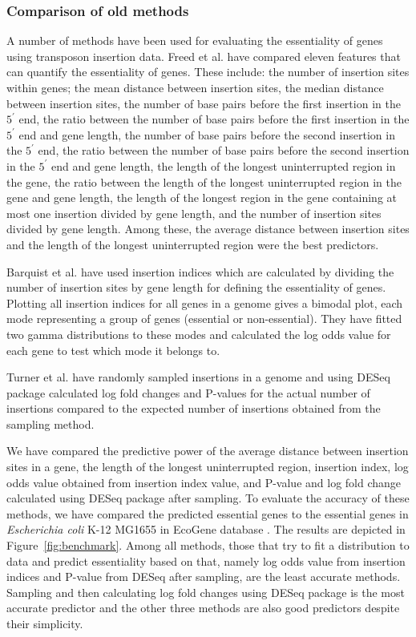 \documentclass[12pt,letterpaper]{article}
\begin{document}
\subsubsection{Comparison of old methods}
A number of methods have been used for evaluating the essentiality of genes using transposon insertion data. Freed et al. \cite{freed_combining_2016} have compared eleven features that can quantify the essentiality of genes. These include: the number of insertion sites within genes; the mean distance between insertion sites, the median distance between insertion sites, the number of base pairs before the first insertion in the $5^\prime$ end, the ratio between the number of base pairs before the first insertion in the $5^\prime$ end and gene length, the number of base pairs before the second insertion in the $5^\prime$ end, the ratio between the number of base pairs before the second insertion in the $5^\prime$ end and gene length, the length of the longest uninterrupted region in the gene, the ratio between the length of the longest uninterrupted region in the gene and gene length, the length of the longest region in the gene containing at most one insertion divided by gene length, and the number of insertion sites divided by gene length. Among these, the average distance between insertion sites and the length of the longest uninterrupted region were the best predictors.

Barquist et al. \cite{barquist_tradis_2016} have used insertion indices which are calculated by dividing the number of insertion sites by gene length for defining the essentiality of genes. Plotting all insertion indices for all genes in a genome gives a bimodal plot, each mode representing a group of genes (essential or non-essential). They have fitted two gamma distributions to these modes and calculated the log odds value for each gene to test which mode it belongs to.

Turner et al. \cite{turner_essential_2015} have randomly sampled insertions in a genome and using DESeq package \cite{anders_differential_2010} calculated log fold changes and P-values for the actual number of insertions compared to the expected number of insertions obtained from the sampling method.

We have compared the predictive power of the average distance between insertion sites in a gene, the length of the longest uninterrupted region, insertion index, log odds value obtained from insertion index value, and P-value and log fold change calculated using DESeq package after sampling. To evaluate the accuracy of these methods, we have compared the predicted essential genes to the essential genes in \textit{Escherichia coli} K-12 MG1655 in EcoGene database \cite{zhou_ecogene_2013}. The results are depicted in Figure~\ref{fig:benchmark}. Among all methods, those that try to fit a distribution to data and predict essentiality based on that, namely log odds value from insertion indices and P-value from DESeq after sampling, are the least accurate methods. Sampling and then calculating log fold changes using DESeq package is the most accurate predictor and the other three methods are also good predictors despite their simplicity.
\end{document}
